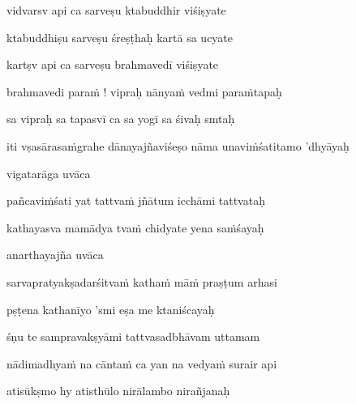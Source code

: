 vidvarsv api ca sarveṣu ktabuddhir viśiṣyate\thinspace{\dandab} \dontdisplaylinenum

ktabuddhiṣu sarveṣu śreṣṭhaḥ kartā sa ucyate \veg\dontdisplaylinenum

kartṣv api ca sarveṣu brahmavedī viśiṣyate\thinspace{\dandab} \dontdisplaylinenum

brahmavedi paraṁ ! vipraḥ nānyaṁ vedmi paraṁtapaḥ \danda\dontdisplaylinenum

sa vipraḥ sa tapasvī ca sa yogī sa śivaḥ smtaḥ \veg\dontdisplaylinenum


\jump
\begin{center}
\ketdanda iti vṣasārasaṁgrahe dānayajñaviśeṣo nāma unaviṁśatitamo 'dhyāyaḥ\ketdanda
\end{center}
\dontdisplaylinenum\vers 
\bekveg\szamveg\vfill\phpspagebreak\szam\bek{}
\thispagestyle{empty}



\jump\jump
\vers

vigatarāga uvāca~{\dandab}\dontdisplaylinenum 

pañcaviṁśati yat tattvaṁ jñātum icchāmi tattvataḥ\thinspace{\danda} \dontdisplaylinenum

kathayasva mamādya tvaṁ chidyate yena saṁśayaḥ \veg\dontdisplaylinenum


anarthayajña uvāca~{\dandab}\dontdisplaylinenum 

sarvapratyakṣadarśitvaṁ kathaṁ māṁ praṣṭum arhasi\thinspace{\danda} \dontdisplaylinenum

pṣṭena kathanīyo 'smi eṣa me ktaniścayaḥ \danda\dontdisplaylinenum

śṇu te sampravakṣyāmi tattvasadbhāvam uttamam \veg\dontdisplaylinenum



nādimadhyaṁ na cāntaṁ ca yan na vedyaṁ surair api\thinspace{\dandab} \dontdisplaylinenum

atisūkṣmo hy atisthūlo nirālambo nirañjanaḥ \veg\dontdisplaylinenum
{}

